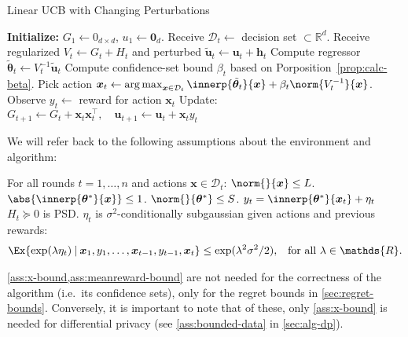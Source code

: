 \documentclass{article}
\renewcommand{\vec}[1]{\bm{#1}}
\newcommand{\inv}[1]{#1^{-1}}
\newcommand{\Real}{\mathds{R}}
\newcommand{\argmax}{\operatorname*{arg\,max}}
\newcommand\given[1][\delimsize]{%
  \providecommand{\delimsize}{}
  \nonscript\:#1\vert\allowbreak\nonscript\:\mathopen{}
}
\DeclarePairedDelimiter{\abs}||
\newcommand{\D}{\mathcal{D}}
\providecommand\transp{\top}
\let\transpsymbol\transp
\renewcommand{\transp}[1]{#1^\transpsymbol}
\newenvironment{assumptions*}[2][]{%
  \begin{assumptions}[#1]
    #2
    \begin{enumerate}[nolistsep]
      \setcounter{enumi}{\theassumption}
      \newcommand{\assume}[1][]{\item\label[assumption]{##1}}
    }{
      \setcounter{assumption}{\theenumi}
    \end{enumerate}
  \end{assumptions}%
}
\begin{document}
\begin{algorithm}
  \caption{Linear UCB with Changing Perturbations}\label{alg:linucb}
  \begin{algorithmic}
    \State \textbf{Initialize:} $G_1 \gets 0_{d\times d}$,
    $u_1\gets \vec 0_{d}$.
    \State Receive $\D_t \gets{}$ decision set ${} \subset \Real^d$.
    \State Receive regularized $V_t \gets G_t + H_t$ and perturbed $\tilde{\vec u}_t \gets \vec u_t + \vec h_t$
    \State Compute regressor $\tilde{\vec\theta}_{t} \gets \inv{V_{t}}\tilde{\vec u}_{t}$
    \State Compute confidence-set bound $\beta_t$ based on Porposition~\ref{prop:calc-beta}.
    \State Pick action $\vec x_t \gets \argmax_{\vec x\in\D_t}
    \innerp{\tilde{\vec \theta}_t}{\vec x} +
    \beta_t\norm{\inv{V_t}}{\vec x}$.
    \State Observe $y_t \gets {}$ reward for action $\vec x_t$
    \State Update: $G_{t+1} \gets G_{t} + \vec x_t \transp{\vec x_t},
    \quad \vec u_{t+1} \gets \vec u_{t} + \vec x_t y_t$
    \EndFor
  \end{algorithmic}
\end{algorithm}

We will refer back to the following assumptions about the environment
and algorithm:
\begin{assumptions*}{%
    For all rounds $t=1,\dotsc,n$ and actions $\vec x\in\D_t$:}
   $\norm{}{\vec x} \le L$.
  $\abs{\innerp{\vec\theta^*}{\vec x}} \le 1$.
   $\norm{}{\vec\theta^*} \le S$.
  $y_t = \innerp{\vec\theta^*}{\vec x_t} + \eta_t$ 
   $H_t \succeq 0$ is PSD.
   $\eta_t$ is $\sigma^2$-conditionally
  subgaussian given actions and previous rewards:
  \begin{align*}
    \Ex{\exp(\lambda\eta_t) \given \vec x_1, y_1, \dotsc, \vec x_{t-1}, y_{t-1}, \vec x_t}
    &\le \exp(\lambda^2\sigma^2/2), &\text{for all } \lambda\in\Real.
  \end{align*}
\end{assumptions*}
\cref{ass:x-bound,ass:meanreward-bound} are not needed for the
correctness of the algorithm (i.e.\ its confidence sets), only for the
regret bounds in \cref{sec:regret-bounds}.  Conversely, it is
important to note that of these, only \cref{ass:x-bound} is needed for
differential privacy (see \cref{ass:bounded-data} in \cref{sec:alg-dp}).
\end{document}
